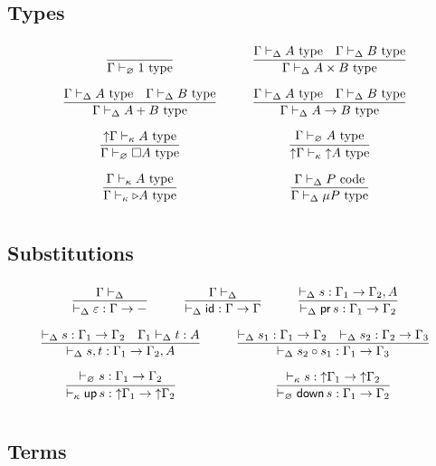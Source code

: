 \subsection*{Types}
\[\arraycolsep=15pt\def\arraystretch{2.8}
\begin{array}{cc}
\infer{\Gamma \vdash_{\varnothing} 1 \type}{} 
&
\infer{\Gamma \vdash_{\Delta} A \times B \type}{\Gamma \vdash_{\Delta} A \type & \Gamma \vdash_{\Delta} B \type}
\\
\infer{\Gamma \vdash_{\Delta} A + B \type}{\Gamma \vdash_{\Delta} A \type & \Gamma \vdash_{\Delta} B \type}
&
\infer{\Gamma \vdash_{\Delta} A \to B \type}{\Gamma \vdash_{\Delta} A \type & \Gamma \vdash_{\Delta} B \type} 
\\
\infer{\Gamma \vdash_{\varnothing} \square A \type}{\up \Gamma \vdash_{\kappa} A \type}
&
\infer{\up \Gamma \vdash_{\kappa} \up A \type}{\Gamma \vdash_{\varnothing} A \type}
\\
\infer{\Gamma \vdash_{\kappa} \later A \type}{\Gamma \vdash_{\kappa} A \type}
&
\infer{\Gamma \vdash_{\Delta} \mu P \type}{\Gamma \vdash_{\Delta} P \poly}
\end{array}
\]

\subsection*{Substitutions}
\[\arraycolsep=15pt\def\arraystretch{2.8}
\begin{array}{cc}
\multicolumn{2}{c}{
\infer{\vdash_{\Delta} \varepsilon : \Gamma \to -}{\Gamma \vdash_{\Delta}}
\qquad \quad
\infer{\vdash_{\Delta} \subid : \Gamma \to \Gamma}{\Gamma \vdash_{\Delta}}
\qquad \quad
\infer{\vdash_{\Delta} \subpr \, s : \Gamma_1 \to
  \Gamma_2}{\vdash_{\Delta} s : \Gamma_1 \to \Gamma_2 , A}
}
\\
\infer{\vdash_{\Delta} s , t : \Gamma_1 \to \Gamma_2 , A}{\vdash_{\Delta} s : \Gamma_1 \to \Gamma_2 & \Gamma_1 \vdash_{\Delta} t : A}
&
\infer{\vdash_{\Delta} s_2 \circ s_1 : \Gamma_1 \to \Gamma_3}{\vdash_{\Delta} s_1 : \Gamma_1 \to \Gamma_2 & \vdash_{\Delta} s_2 : \Gamma_2 \to \Gamma_3}
\\
\infer{\vdash_{\kappa} \mathsf{up} \,s : \up \Gamma_1\to \up
  \Gamma_2}{\vdash_{\varnothing} s : \Gamma_1 \to \Gamma_2}
&
\infer{\vdash_{\varnothing} \mathsf{down} \,s : \Gamma_1 \to
  \Gamma_2}{\vdash_{\kappa} s : \up \Gamma_1 \to \up \Gamma_2}
\end{array}
\]

\subsection*{Terms}

